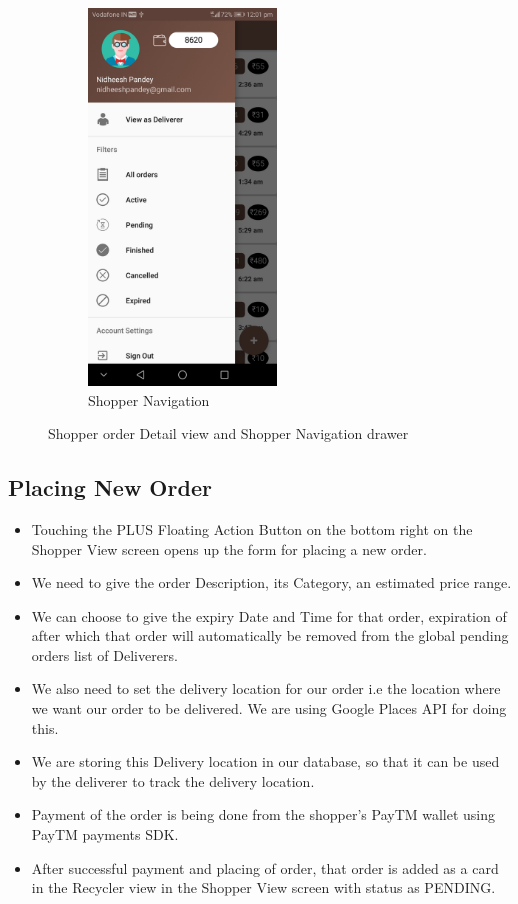 \documentclass{report}
\begin{document}
\begin{figure}[h!]
\begin{subfigure}[b]{.3\textwidth}
\includegraphics[width=5cm]{shopper_drawer.jpg}
\caption{\centering Shopper Navigation}
\end{subfigure}
\caption{Shopper order Detail view and Shopper Navigation drawer} 
\label{fig:NASA_Logo}
\end{figure}


\subsection{Placing New Order}
\begin{itemize}
\item Touching the PLUS Floating Action Button on the bottom right on the Shopper View screen opens up the form for placing a new order.
\item We need to give the order Description, its Category, an estimated price range.
\item We can choose to give the expiry Date and Time for that order, expiration of after which that order will automatically be removed from the global pending orders list of Deliverers.
\item We also need to set the delivery location for our order i.e the location where we want our order to be delivered. We are using Google Places API for doing this.
\item We are storing this Delivery location in our database, so that it can be used by the deliverer to track the delivery location.
\item Payment of the order is being done from the shopper’s PayTM wallet using PayTM payments SDK.
\item After successful payment and placing of order, that order is added as a card in the Recycler view in the Shopper View screen with status as PENDING.

\end{itemize}
\end{document}
